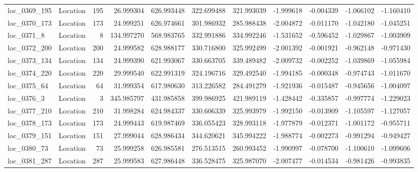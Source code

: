 \begin{tabular}{llrrrrrrrrr}
 loc_0369_195 &        Location &             195 &  26.999304 & 626.993448 &  322.699488 &    321.993039 &  -1.999618 &  -0.004339 &   -1.066102 &     -1.160410 \\
 loc_0370_173 &        Location &             173 &  24.999251 & 626.974661 &  301.986932 &    285.988438 &  -2.004872 &  -0.011170 &   -1.042180 &     -1.045251 \\
   loc_0371_8 &        Location &               8 & 134.997270 & 568.983765 &  332.991886 &    334.992246 &  -1.531652 &  -0.596452 &   -1.029867 &     -1.003909 \\
 loc_0372_200 &        Location &             200 &  24.999582 & 628.988177 &  330.716800 &    325.992499 &  -2.001392 &  -0.001921 &   -0.962148 &     -0.971430 \\
 loc_0373_134 &        Location &             134 &  24.999390 & 621.993067 &  330.663705 &    339.489482 &  -2.009732 &  -0.002252 &   -1.039869 &     -1.055984 \\
 loc_0374_220 &        Location &             220 &  29.999540 & 622.991319 &  324.196716 &    329.492540 &  -1.994185 &  -0.000348 &   -0.974743 &     -1.011670 \\
  loc_0375_64 &        Location &              64 &  31.999354 & 617.980630 &  313.226582 &    284.491279 &  -1.921936 &  -0.015487 &   -0.945656 &     -1.004097 \\
   loc_0376_3 &        Location &               3 & 345.985797 & 431.985858 &  399.986925 &    421.989119 &  -1.428442 &  -0.335857 &   -0.997774 &     -1.229023 \\
 loc_0377_210 &        Location &             210 &  31.998284 & 624.984337 &  330.606339 &    325.993979 &  -1.992150 &  -0.013909 &   -1.105597 &     -1.127057 \\
 loc_0378_173 &        Location &             173 &  24.999443 & 619.987469 &  336.055423 &    328.993118 &  -1.977879 &  -0.012371 &   -1.001172 &     -0.955711 \\
 loc_0379_151 &        Location &             151 &  27.999044 & 628.986434 &  344.620621 &    345.994222 &  -1.988774 &  -0.002273 &   -0.991294 &     -0.949427 \\
  loc_0380_73 &        Location &              73 &  25.999258 & 626.985581 &  276.513515 &    260.993452 &  -1.990997 &  -0.078700 &   -1.100610 &     -1.099606 \\
 loc_0381_287 &        Location &             287 &  25.999583 & 627.986448 &  336.528475 &    325.987070 &  -2.007477 &  -0.014534 &   -0.981426 &     -0.993835 \\

\end{tabular}
